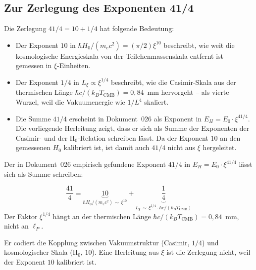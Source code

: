\subsection{Zur Zerlegung des Exponenten 41/4}

Die Zerlegung $41/4 = 10 + 1/4$ hat folgende Bedeutung:

\begin{itemize}
    \item Der Exponent $10$ in $\hbar H_0/(m_e c^2) = (\pi/2)\xi^{10}$
    beschreibt, wie weit die kosmologische Energieskala von der
    Teilchenmassenskala entfernt ist -- gemessen in $\xi$-Einheiten.

    \item Der Exponent $1/4$ in $L_\xi \propto \xi^{1/4}$ beschreibt,
    wie die Casimir-Skala aus der thermischen Länge
    $\hbar c/(k_BT_\text{CMB}) = 0{,}84$~mm hervorgeht -- als
    vierte Wurzel, weil die Vakuumenergie wie $1/L^4$ skaliert.

    \item Die Summe $41/4$ erscheint in Dokument~026 als Exponent in
    $E_H = E_0 \cdot \xi^{41/4}$. Die vorliegende Herleitung zeigt, dass
    er sich als Summe der Exponenten der Casimir- und der H$_0$-Relation
    schreiben lässt. Da der Exponent $10$ an den gemessenen $H_0$
    kalibriert ist, ist damit auch $41/4$ nicht aus $\xi$ hergeleitet.
\end{itemize}

\begin{keyresult}
    Der in Dokument~026 empirisch gefundene Exponent $41/4$ in
    $E_H = E_0 \cdot \xi^{41/4}$ lässt sich als Summe schreiben:

    \begin{equation}
        \frac{41}{4}
        = \underbrace{10}_{\hbar H_0/(m_e c^2) \,\sim\, \xi^{10}}
        + \underbrace{\frac{1}{4}}_{L_\xi \,\sim\, \xi^{1/4} \cdot \hbar c/(k_B T_\text{CMB})}
        \label{eq:41_4_explained}
    \end{equation}
    Der Faktor $\xi^{1/4}$ hängt an der thermischen Länge
    $\hbar c/(k_BT_\text{CMB}) = 0{,}84$~mm, nicht an $\ell_P$.

    Er codiert die Kopplung zwischen Vakuumstruktur (Casimir, $1/4$)
    und kosmologischer Skala (H$_0$, $10$). Eine Herleitung aus $\xi$ ist
    die Zerlegung nicht, weil der Exponent $10$ kalibriert ist.
\end{keyresult}

